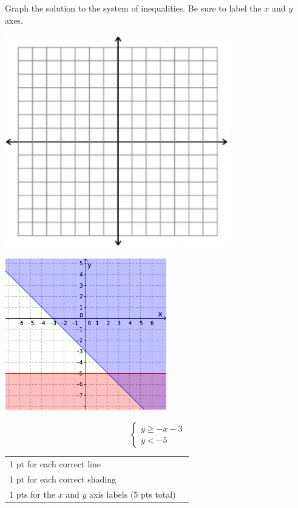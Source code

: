 {
	Graph the solution to the system of inequalities. Be sure to label the $x$ and $y$ axes. \begin{onlyproblem}\begin{center}\includegraphics{fig-graphpaper.png}\end{center}\end{onlyproblem} \begin{onlysolution}\begin{center}\includegraphics{fig095-12-5-a-answer}\end{center}\end{onlysolution}
	$$\begin{cases}y\geq -x-3 \\ y<-5 \end{cases}$$
}
{
	\begin{tabular}{l r}
	1 pt for each correct line\\
	1 pt for each correct shading\\
	1 pts for the $x$ and $y$ axis labels (5 pts total)\\
	\end{tabular}
}

